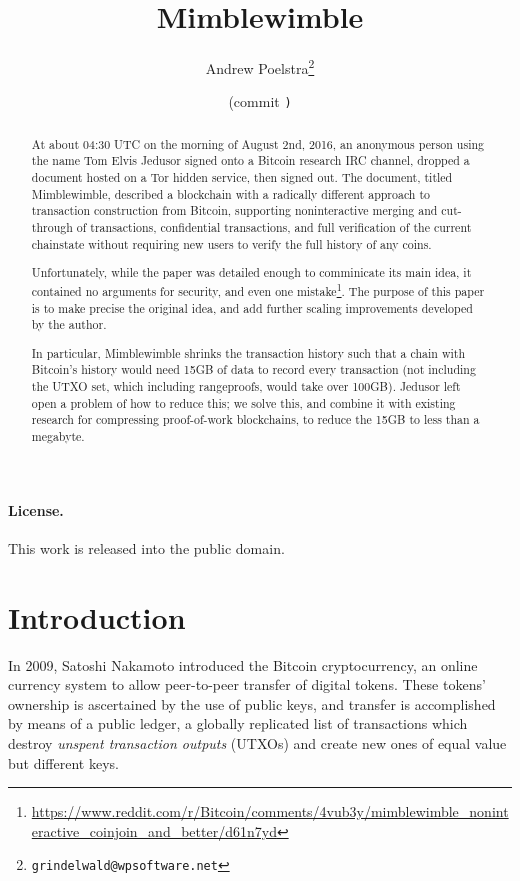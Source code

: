\documentclass[letterpaper]{article}
\title{Mimblewimble}
\author{Andrew Poelstra\footnote{\texttt{grindelwald@wpsoftware.net}}}
\date{\gitAuthorDate{} (commit \texttt{\gitAbbrevHash)}}
\begin{document}
\maketitle

\begin{abstract} 
At about 04:30 UTC on the morning of August 2nd, 2016, an anonymous person
using the name Tom Elvis Jedusor signed onto a Bitcoin research IRC channel,
dropped a document hosted on a Tor hidden service\cite{voldemort2016}, then signed out. The
document, titled Mimblewimble, described a blockchain with a radically
different approach to transaction construction from Bitcoin, supporting
noninteractive merging and cut-through of transactions, confidential
transactions, and full verification of the current chainstate without
requiring new users to verify the full history of any coins.

Unfortunately, while the paper was detailed enough to comminicate its main
idea, it contained no arguments for security, and even one mistake\footnote{\url{https://www.reddit.com/r/Bitcoin/comments/4vub3y/mimblewimble_noninteractive_coinjoin_and_better/d61n7yd}}.
The purpose of this paper is to make precise the original idea, and add
further scaling improvements developed by the author.

In particular, Mimblewimble shrinks the transaction history such that a
chain with Bitcoin's history would need 15GB of data to record every
transaction (not including the UTXO set, which including rangeproofs,
would take over 100GB). Jedusor left open a problem of how to reduce
this; we solve this, and combine it with existing research for compressing
proof-of-work blockchains, to reduce the 15GB to less than a megabyte.
\end{abstract}

\paragraph{License.} This work is released into the public domain.

\clearpage
\tableofcontents

\modulolinenumbers[10]
\linenumbers

\section{Introduction}

In 2009, Satoshi Nakamoto introduced the Bitcoin cryptocurrency\cite{nakamoto2009},
an online currency system to allow peer-to-peer transfer of digital tokens.
These tokens' ownership is ascertained by the use of public keys, and transfer
is accomplished by means of a public ledger, a globally replicated list of
transactions which destroy \emph{unspent transaction outputs} (UTXOs) and
create new ones of equal value but different keys.
\end{document}
